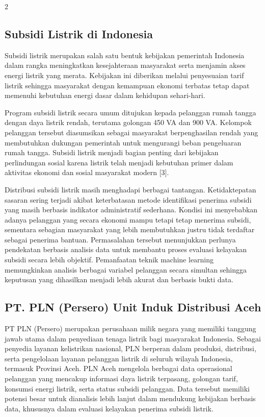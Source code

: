 \documentclass[12pt, a4paper, onecolumn, oneside]{report}
\begin{document}
\begin{spacing}{2}
\subsection{Subsidi Listrik di Indonesia}
Subsidi listrik merupakan salah satu bentuk kebijakan pemerintah Indonesia dalam rangka meningkatkan kesejahteraan masyarakat serta menjamin akses energi listrik yang merata. Kebijakan ini diberikan melalui penyesuaian tarif listrik sehingga masyarakat dengan kemampuan ekonomi terbatas tetap dapat memenuhi kebutuhan energi dasar dalam kehidupan sehari-hari.

Program subsidi listrik secara umum ditujukan kepada pelanggan rumah tangga dengan daya listrik rendah, terutama golongan 450 VA dan 900 VA. Kelompok pelanggan tersebut diasumsikan sebagai masyarakat berpenghasilan rendah yang membutuhkan dukungan pemerintah untuk mengurangi beban pengeluaran rumah tangga. Subsidi listrik menjadi bagian penting dari kebijakan perlindungan sosial karena listrik telah menjadi kebutuhan primer dalam aktivitas ekonomi dan sosial masyarakat modern [3].

Distribusi subsidi listrik masih menghadapi berbagai tantangan. Ketidaktepatan sasaran sering terjadi akibat keterbatasan metode identifikasi penerima subsidi yang masih berbasis indikator administratif sederhana. Kondisi ini menyebabkan adanya pelanggan yang secara ekonomi mampu tetapi tetap menerima subsidi, sementara sebagian masyarakat yang lebih membutuhkan justru tidak terdaftar sebagai penerima bantuan. Permasalahan tersebut menunjukkan perlunya pendekatan berbasis analisis data untuk membantu proses evaluasi kelayakan subsidi secara lebih objektif. Pemanfaatan teknik machine learning memungkinkan analisis berbagai variabel pelanggan secara simultan sehingga keputusan yang dihasilkan menjadi lebih akurat dan berbasis bukti data.

\subsection{PT. PLN (Persero) Unit Induk Distribusi Aceh}
PT PLN (Persero) merupakan perusahaan milik negara yang memiliki tanggung jawab utama dalam penyediaan tenaga listrik bagi masyarakat Indonesia. Sebagai penyedia layanan kelistrikan nasional, PLN berperan dalam produksi, distribusi, serta pengelolaan layanan pelanggan listrik di seluruh wilayah Indonesia, termasuk Provinsi Aceh. PLN Aceh mengelola berbagai data operasional pelanggan yang mencakup informasi daya listrik terpasang, golongan tarif, konsumsi energi listrik, serta status subsidi pelanggan. Data tersebut memiliki potensi besar untuk dianalisis lebih lanjut dalam mendukung kebijakan berbasis data, khususnya dalam evaluasi kelayakan penerima subsidi listrik.


\end{spacing}
\end{document}
